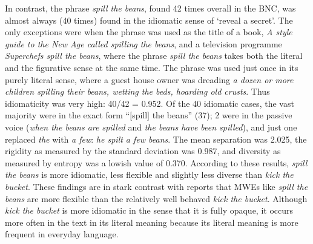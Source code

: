\documentclass[output=paper]{langsci/langscibook}
\begin{document}
In contrast, the phrase \textit{spill the beans}, found 42 times overall in the
BNC, was almost always (40 times) found in the idiomatic sense of `reveal a secret'. The only exceptions were when the phrase was used as
the title of a book, \textit{A style guide to the New Age called spilling the
beans}, and a television programme \textit{Superchefs spill the beans}, where
the phrase \textit{spill the beans} takes both the literal and the figurative
sense at the same time. The phrase was used just once in its purely
literal sense, where a guest house owner was dreading \textit{a dozen or more
children spilling their beans, wetting the beds, hoarding old crusts}.
Thus idiomaticity was very high: 40/42 = 0.952. Of the 40 idiomatic
cases, the vast majority were in the exact form “$[$spill$]$ the beans”
(37); 2 were in the passive voice (\textit{when the beans are spilled} and
\textit{the beans have been spilled}), and just one replaced \textit{the} with \textit{a
few}: \textit{he spilt a few beans}. The mean separation was 2.025, the
rigidity as measured by the standard deviation was 0.987, and diversity
as measured by entropy was a lowish value of 0.370. According to these
results, \textit{spill the beans} is more idiomatic, less flexible and
slightly less diverse than \textit{kick the bucket}. These findings are in
stark contrast with reports that MWEs like \textit{spill the beans} are more
flexible than the relatively well behaved \textit{kick the bucket}. Although
\textit{kick the bucket} is more idiomatic in the sense that it is fully
opaque, it occurs more often in the text in its literal meaning because
its literal meaning is more frequent in everyday language. 
\end{document}
